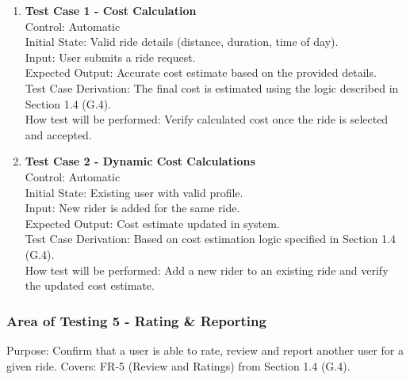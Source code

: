 \documentclass[12pt, titlepage]{article}
\begin{document}
\begin{enumerate}
\item \textbf{Test Case 1 - Cost Calculation}\\
Control: Automatic\\
Initial State: Valid ride details (distance, duration, time of day).\\
Input: User submits a ride request.\\
Expected Output: Accurate cost estimate based on the provided details.\\
Test Case Derivation: The final cost is estimated using the logic described in Section 1.4 (G.4).\\
How test will be performed: Verify calculated cost once the ride is selected and accepted.\\[5pt]

\item \textbf{Test Case 2 - Dynamic Cost Calculations}\\
Control: Automatic\\
Initial State: Existing user with valid profile.\\
Input: New rider is added for the same ride.\\
Expected Output: Cost estimate updated in system.\\
Test Case Derivation: Based on cost estimation logic specified in Section 1.4 (G.4).\\
How test will be performed: Add a new rider to an existing ride and verify the updated cost estimate.\\

\end{enumerate}

\subsubsection{Area of Testing 5 - Rating \& Reporting}

Purpose: Confirm that a user is able to rate, review and report another user for a given ride.  
Covers: FR-5 (Review and Ratings) from Section 1.4 (G.4).
\end{document}
